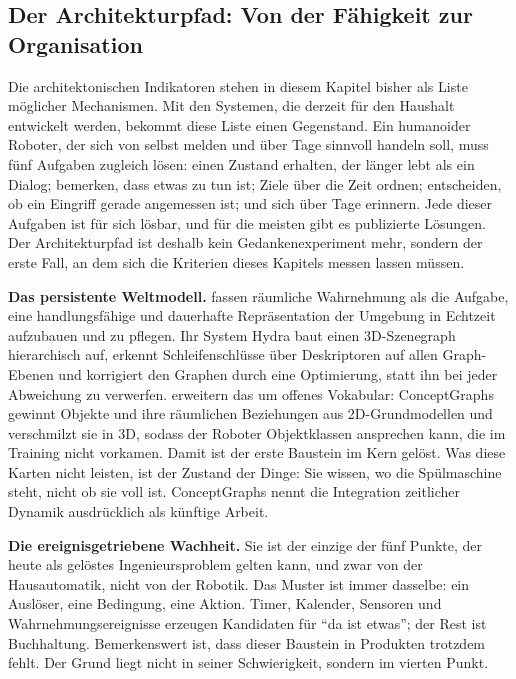 \documentclass[acmlarge, noacm]{acmart}
\begin{document}
\subsection{Der Architekturpfad: Von der Fähigkeit zur Organisation}

Die architektonischen Indikatoren stehen in diesem Kapitel bisher als Liste möglicher Mechanismen. Mit den Systemen, die derzeit für den Haushalt entwickelt werden, bekommt diese Liste einen Gegenstand. Ein humanoider Roboter, der sich von selbst melden und über Tage sinnvoll handeln soll, muss fünf Aufgaben zugleich lösen: einen Zustand erhalten, der länger lebt als ein Dialog; bemerken, dass etwas zu tun ist; Ziele über die Zeit ordnen; entscheiden, ob ein Eingriff gerade angemessen ist; und sich über Tage erinnern. Jede dieser Aufgaben ist für sich lösbar, und für die meisten gibt es publizierte Lösungen. Der Architekturpfad ist deshalb kein Gedankenexperiment mehr, sondern der erste Fall, an dem sich die Kriterien dieses Kapitels messen lassen müssen.

\textbf{Das persistente Weltmodell.} \citet{hughes2024} fassen räumliche Wahrnehmung als die Aufgabe, eine handlungsfähige und dauerhafte Repräsentation der Umgebung in Echtzeit aufzubauen und zu pflegen. Ihr System Hydra baut einen 3D-Szenegraph hierarchisch auf, erkennt Schleifenschlüsse über Deskriptoren auf allen Graph-Ebenen und korrigiert den Graphen durch eine Optimierung, statt ihn bei jeder Abweichung zu verwerfen. \citet{gu2024} erweitern das um offenes Vokabular: ConceptGraphs gewinnt Objekte und ihre räumlichen Beziehungen aus 2D-Grundmodellen und verschmilzt sie in 3D, sodass der Roboter Objektklassen ansprechen kann, die im Training nicht vorkamen. Damit ist der erste Baustein im Kern gelöst. Was diese Karten nicht leisten, ist der Zustand der Dinge: Sie wissen, wo die Spülmaschine steht, nicht ob sie voll ist. ConceptGraphs nennt die Integration zeitlicher Dynamik ausdrücklich als künftige Arbeit.

\textbf{Die ereignisgetriebene Wachheit.} Sie ist der einzige der fünf Punkte, der heute als gelöstes Ingenieursproblem gelten kann, und zwar von der Hausautomatik, nicht von der Robotik. Das Muster ist immer dasselbe: ein Auslöser, eine Bedingung, eine Aktion. Timer, Kalender, Sensoren und Wahrnehmungsereignisse erzeugen Kandidaten für ``da ist etwas''; der Rest ist Buchhaltung. Bemerkenswert ist, dass dieser Baustein in Produkten trotzdem fehlt. Der Grund liegt nicht in seiner Schwierigkeit, sondern im vierten Punkt.
\end{document}
